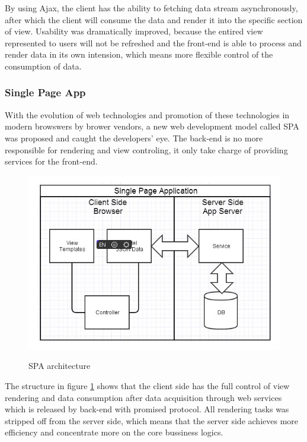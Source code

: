 By using Ajax, the client has the ability to fetching data stream asynchronously, after which the client will consume the data and render it into the specific section of view. Usability was dramatically improved, because the entired view represented to users will not be refreshed and the front-end is able to process and render data in its own intension, which means more flexible control of the consumption of data.

\subsubsection{Single Page App}

With the evolution of web technologies and promotion of these technologies in modern browswers by brower vendors, a new web development model called \gls{SPA} was proposed and caught the developers' eye. The back-end is no more responsible for rendering and view controling, it only take charge of providing services for the front-end.

\begin{figure}[!htbp]
  \caption{SPA architecture}
  \centering
    \includegraphics[width=1\textwidth]{Figures/3_3.png}
  \label{fig:3.3}
\end{figure}

The structure in figure \ref{fig:3.3} shows that the client side has the full control of view rendering and data consumption after data acquisition through web services which is released by back-end with promised protocol. All rendering tasks was stripped off from the server side, which means that the server side achieves more efficiency and concentrate more on the core bussiness logics.

